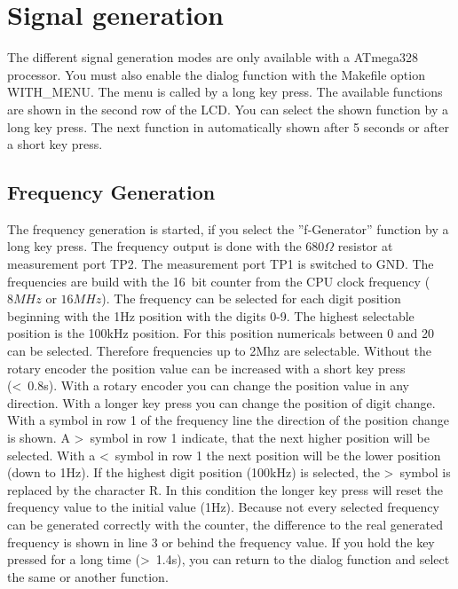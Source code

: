 \chapter{Signal generation}

The different signal generation modes are only available with a ATmega328 processor.
You must also enable the dialog function with the Makefile option WITH\_MENU.
The menu is called by a long key press. The available functions are shown in the
second row of the LCD. You can select the shown function by a long key press.
The next function in automatically shown after 5 seconds or after a short key press.

\label{sec:generation}
\section{Frequency Generation}
The frequency generation is started, if you select the ''f-Generator'' function by
a long key press.
The frequency output is done with the \(680\Omega\) resistor at measurement port TP2.
The measurement port TP1 is switched to GND.
The frequencies are build with the 16~bit counter from the CPU clock frequency 
(\(8MHz\) or \(16MHz\)).
The frequency can be selected for each digit position beginning with the 1Hz position with the digits 0-9.
The highest selectable position is the 100kHz position. For this position numericals between 0 and 20 can be selected.
Therefore frequencies up to 2Mhz are selectable.
Without the rotary encoder the position value can be increased with a short key press (\textless~0.8s).
With a rotary encoder you can change the position value in any direction.
With a longer key press you can change the position of digit change.
With a symbol in row 1 of the frequency line the direction of the position change is shown. 
A \textgreater~symbol in row 1 indicate, that the next higher position will be selected.
With a \textless~symbol in row 1 the next position will be the lower position (down to 1Hz).
If the highest digit position (100kHz) is selected, the \textgreater~symbol is replaced by the character R.
In this condition the longer key press will reset the frequency value to the initial value (1Hz).
Because not every selected frequency can be generated correctly with the counter,
the difference to the real generated frequency is shown in line 3 or behind the frequency value.
If you hold the key pressed for a long time (\textgreater~1.4s), you can return to the dialog function and select
the same or another function.

